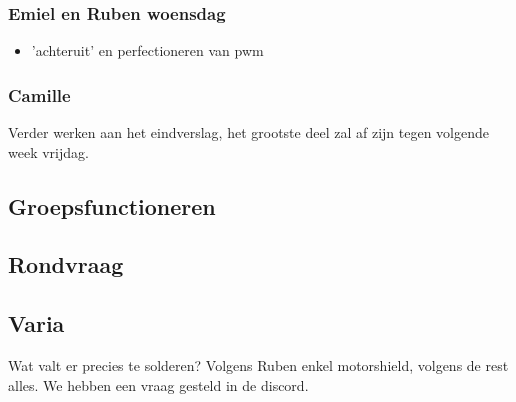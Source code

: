 \documentclass[a4paper,kulak]{kulakarticle} %
\begin{document}
\subsubsection*{Emiel en Ruben woensdag}
\begin{itemize}
	\item 'achteruit' en perfectioneren van pwm
	
\end{itemize}

\subsubsection*{Camille}
Verder werken aan het eindverslag, het grootste deel zal af zijn tegen volgende week vrijdag.

\subsection{Groepsfunctioneren}

\subsection{Rondvraag}

\subsection{Varia}
Wat valt er precies te solderen? Volgens Ruben enkel motorshield, volgens de rest alles. We hebben een vraag gesteld in de discord.
\end{document}
